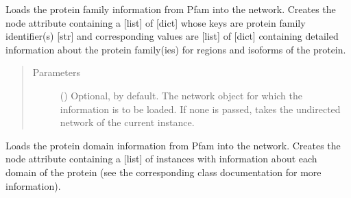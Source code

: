\documentclass[letterpaper,10pt,english]{sphinxmanual}
\begin{document}
\begin{fulllineitems}
\begin{fulllineitems}
\label{\detokenize{reference:pypath.main.PyPath.load_pfam2}}
Loads the protein family information from Pfam into the network.
Creates the node attribute  containing a {[}list{]} of
{[}dict{]} whose keys are protein family identifier(s) {[}str{]} and
corresponding values are {[}list{]} of {[}dict{]} containing detailed
information about the protein family(ies) for regions and
isoforms of the protein.
\begin{quote}\begin{description}
\item[{Parameters}] \leavevmode
{} () \textendash{} Optional,  by default. The network object for which
the information is to be loaded. If none is passed, takes
the undirected network of the current instance.

\end{description}\end{quote}

\end{fulllineitems}


\begin{fulllineitems}
\label{\detokenize{reference:pypath.main.PyPath.load_pfam3}}
Loads the protein domain information from Pfam into the network.
Creates the node attribute  containing a {[}list{]} of
 instances with information
about each domain of the protein (see the corresponding class
documentation for more information).

\end{fulllineitems}


\begin{fulllineitems}
\label{\detokenize{reference:pypath.main.PyPath.load_phospho_dmi}}
\end{fulllineitems}


\end{fulllineitems}
\end{document}
